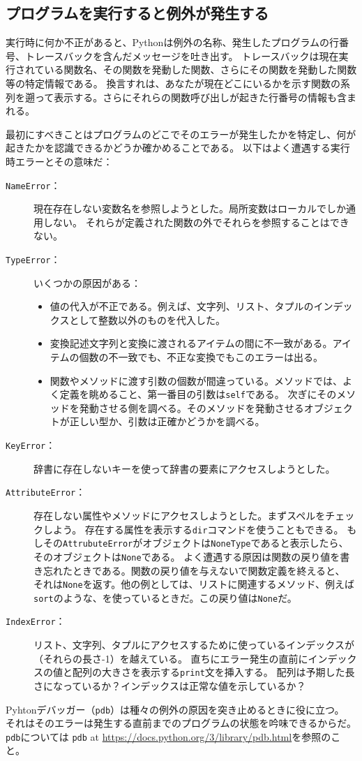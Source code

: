 \documentclass[a4j,12pt,makeidx]{jbook}
\begin{document}
\subsection*{プログラムを実行すると例外が発生する}
実行時に何か不正があると、Pythonは例外の名称、発生したプログラムの行番号、トレースバックを含んだメッセージを吐き出す。
トレースバックは現在実行されている関数名、その関数を発動した関数、さらにその関数を発動した関数等の特定情報である。
換言すれは、あなたが現在どこにいるかを示す関数の系列を遡って表示する。さらにそれらの関数呼び出しが起きた行番号の情報も含まれる。 \par
最初にすべきことはプログラムのどこでそのエラーが発生したかを特定し、何が起きたかを認識できるかどうか確かめることである。
以下はよく遭遇する実行時エラーとその意味だ：
\begin{description}
\item [{\tt NameError}：] 現在存在しない変数名を参照しようとした。局所変数はローカルでしか通用しない。
それらが定義された関数の外でそれらを参照することはできない。
\item [{\tt TypeError}：] いくつかの原因がある：
\begin{itemize}
\item 値の代入が不正である。例えば、文字列、リスト、タプルのインデックスとして整数以外のものを代入した。
\item 変換記述文字列と変換に渡されるアイテムの間に不一致がある。アイテムの個数の不一致でも、不正な変換でもこのエラーは出る。
\item 関数やメソッドに渡す引数の個数が間違っている。メソッドでは、よく定義を眺めること、第一番目の引数は{\tt self}である。
次ぎにそのメソッドを発動させる側を調べる。そのメソッドを発動させるオブジェクトが正しい型か、引数は正確かどうかを調べる。
\end{itemize}
\item [{\tt KeyError}：] 辞書に存在しないキーを使って辞書の要素にアクセスしようとした。
\item [{\tt AttributeError}：] 存在しない属性やメソッドにアクセスしようとした。まずスペルをチェックしよう。
存在する属性を表示する{\tt dir}コマンドを使うこともできる。
もしその{\tt AttrubuteError}がオブジェクトは{\tt NoneType}であると表示したら、そのオブジェクトは{\tt None}である。
よく遭遇する原因は関数の戻り値を書き忘れたときである。関数の戻り値を与えないで関数定義を終えると、
それは{\tt None}を返す。他の例としては、リストに関連するメソッド、例えば{\tt sort}のような、を使っているときだ。この戻り値は{\tt None}だ。
\item [{\tt IndexError}：] リスト、文字列、タプルにアクセスするために使っているインデックスが（それらの長さ-1）を越えている。
直ちにエラー発生の直前にインデックスの値と配列の大きさを表示する{\tt print}文を挿入する。
配列は予期した長さになっているか？インデックスは正常な値を示しているか？
\end{description}
Pyhtonデバッガー（{\tt pdb}）は種々の例外の原因を突き止めるときに役に立つ。
それはそのエラーは発生する直前までのプログラムの状態を吟味できるからだ。{\tt pdb}については
{\tt pdb} at \url{https://docs.python.org/3/library/pdb.html}を参照のこと。
\end{document}
